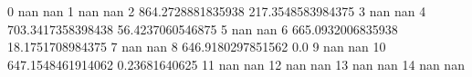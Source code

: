0 nan nan
1 nan nan
2 864.2728881835938 217.3548583984375
3 nan nan
4 703.3417358398438 56.4237060546875
5 nan nan
6 665.0932006835938 18.1751708984375
7 nan nan
8 646.9180297851562 0.0
9 nan nan
10 647.1548461914062 0.23681640625
11 nan nan
12 nan nan
13 nan nan
14 nan nan
